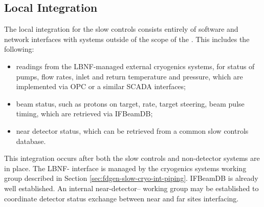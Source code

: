 \subsection{Local Integration}
\label{sec:fddp-slow-cryo-slow-loc-integ}


The local integration for the slow controls consists entirely of software
and network interfaces with systems outside of the scope of the .
This includes the following:
\begin{itemize}
\item readings from the LBNF-managed external cryogenics systems, for status of pumps, flow rates, inlet and return temperature and pressure, which are implemented via OPC or a similar SCADA interfaces;
\item beam status, such as protons on target, rate, target steering, beam pulse timing, which are retrieved via IFBeamDB;
\item near detector status, which can be retrieved from a common slow controls database.
\end{itemize}

This integration occurs after both the slow controls and non-detector
systems are in place.  The LBNF- interface is managed by the
cryogenics systems working group described in Section
\ref{sec:fdgen-slow-cryo-int-piping}.  IFBeamDB is already well established.
An internal near-detector-- working group may be established
to coordinate detector status exchange between near and far sites interfacing.



%
%  
%  

%
%  

